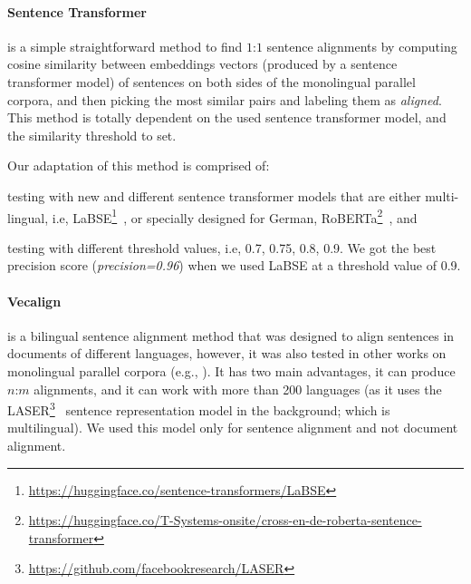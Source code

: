 \documentclass[11pt]{article}
\begin{document}
\paragraph{Sentence Transformer} \cite{reimers-gurevych-2020-making}
is a simple straightforward method to find $1$:$1$ sentence alignments by computing cosine similarity between embeddings vectors (produced by a sentence transformer model) of sentences on both sides of the monolingual parallel corpora, and then picking the most similar pairs and labeling them as \emph{aligned}.
This method is totally dependent on the used sentence transformer model, and the similarity threshold to set.

Our adaptation of this method is comprised of: 
\begin{enumerate*}[label=\roman*)]
    \item testing with new and different sentence transformer models that are either multi-lingual, i.e, LaBSE\footnote{\href{https://huggingface.co/sentence-transformers/LaBSE}{https://huggingface.co/sentence-transformers/LaBSE}}~\cite{feng-etal-2022-language}, or specially designed for German, RoBERTa\footnote{\href{https://huggingface.co/T-Systems-onsite/cross-en-de-roberta-sentence-transformer}{https://huggingface.co/T-Systems-onsite/cross-en-de-roberta-sentence-transformer}}~\cite{conneau-etal-2020-unsupervised}, and
    \item testing with different threshold values, i.e, 0.7, 0.75, 0.8, 0.9. We got the best precision score (\textit{precision=0.96}) when we used LaBSE at a threshold value of 0.9. 
\end{enumerate*}


\paragraph{Vecalign} \cite{thompson-koehn-2020-exploiting}
is a bilingual sentence alignment method that was designed to align sentences in documents of different languages, however, it was also tested in other works on monolingual parallel corpora (e.g., \citet{spring-etal-2022-ensembling}). It has two main advantages, it can produce $n$:$m$ alignments, and it can work with more than 200 languages (as it uses the LASER\footnote{\href{https://github.com/facebookresearch/LASER}{https://github.com/facebookresearch/LASER}}~\cite{artetxe-schwenk-2019-massively} sentence representation model in the background; which is multilingual). We used this model only for sentence alignment and not document alignment.
\end{document}
